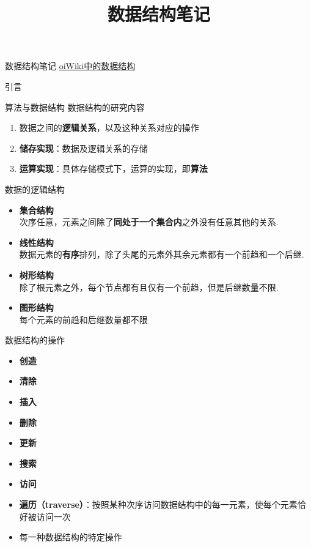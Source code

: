\documentclass[
  ignorenonframetext,
]{beamer}
\title{数据结构笔记}
\author{}
\date{}
\providecommand{\tightlist}{%
  \setlength{\itemsep}{0pt}\setlength{\parskip}{0pt}}
\begin{document}
\frame{\titlepage}

\begin{frame}[fragile]{数据结构笔记}
\protect{}\label{ux6570ux636eux7ed3ux6784ux7b14ux8bb0}
\href{https://oi-wiki.org/ds}{oiWiki中的数据结构}

\begin{block}{引言}
\protect{}\label{ux5f15ux8a00}
\begin{block}{算法与数据结构}
\protect{}\label{ux7b97ux6cd5ux4e0eux6570ux636eux7ed3ux6784}
数据结构的研究内容

\begin{enumerate}
\tightlist
\item
  数据之间的\textbf{逻辑关系}，以及这种关系对应的操作
\item
  \textbf{储存实现}：数据及逻辑关系的存储
\item
  \textbf{运算实现}：具体存储模式下，运算的实现，即\textbf{算法}
\end{enumerate}

\begin{block}{数据的逻辑结构}
\protect{}\label{ux6570ux636eux7684ux903bux8f91ux7ed3ux6784}
\begin{itemize}
\tightlist
\item
  \textbf{集合结构}\\
  次序任意，元素之间除了\textbf{同处于一个集合内}之外没有任意其他的关系.
\item
  \textbf{线性结构}\\
  数据元素的\textbf{有序}排列，除了头尾的元素外其余元素都有一个前趋和一个后继.
\item
  \textbf{树形结构}\\
  除了根元素之外，每个节点都有且仅有一个前趋，但是后继数量不限.
\item
  \textbf{图形结构}\\
  每个元素的前趋和后继数量都不限\\
\end{itemize}
\end{block}

\begin{block}{数据结构的操作}
\protect{}\label{ux6570ux636eux7ed3ux6784ux7684ux64cdux4f5c}
\begin{itemize}
\tightlist
\item
  \textbf{创造}
\item
  \textbf{清除}
\item
  \textbf{插入}
\item
  \textbf{删除}
\item
  \textbf{更新}
\item
  \textbf{搜索}
\item
  \textbf{访问}
\item
  \textbf{遍历（traverse）}：按照某种次序访问数据结构中的每一元素，使每个元素恰好被访问一次
\item
  每一种数据结构的特定操作
\end{itemize}


\end{block}
\end{block}
\end{block}
\end{frame}
\end{document}
